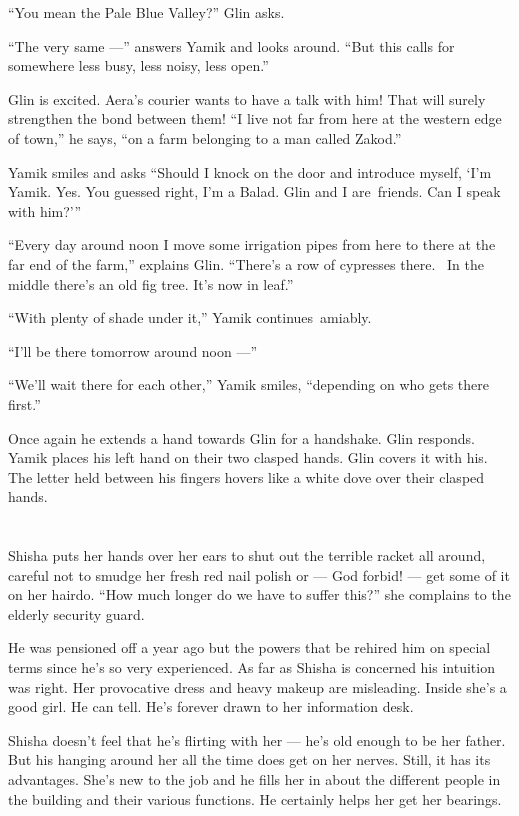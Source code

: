 \documentclass[twoside,11pt]{book}
\begin{document}
``You mean the Pale Blue Valley?'' Glin asks.

``The very same ---'' answers Yamik and looks around. ``But this calls for
somewhere less busy, less noisy, less open.''

Glin is excited.  Aera's courier wants to have a talk with him! That will surely strengthen the bond between them!
``I live not far from here at the western edge of town,'' he says, ``on a farm
belonging to a man called Zakod.''

Yamik smiles and asks ``Should I knock on the door and introduce myself, `I'm Yamik. Yes. You guessed
right, I'm a Balad. Glin and I are~friends. Can I speak with him?{}'\thinspace''

``Every day around noon I move some irrigation pipes from here to there at the far end of the farm,''
explains Glin. ``There's a row of cypresses there. ~In the middle there's an old fig tree. It's now in
leaf.''

``With plenty of shade under it,'' Yamik continues~amiably.

``I'll be there tomorrow around noon ---''

``We'll wait there for each other,'' Yamik smiles, ``depending on who gets there
first.''

Once again he extends a hand towards Glin for a handshake. Glin responds. Yamik places his left hand on their two
clasped hands. Glin covers it with his. The letter held between his fingers hovers like a white dove over their clasped
hands.


\bigskip

\chapter{}

Shisha puts her hands over her ears to shut out the terrible racket all around, careful not to smudge her fresh red nail
polish or --- God forbid! --- get some of it on her hairdo. ``How much longer do we have to suffer
this?'' she complains to the elderly security guard.

He was pensioned off a year ago but the powers that be rehired him on special terms since he's so very experienced. As
far as Shisha is concerned his intuition was right. Her provocative dress and heavy makeup are misleading. Inside she's
a good girl. He can tell. He's forever drawn to her information desk.

Shisha doesn't feel that he's flirting with her ---  he's old enough to be her father. But his hanging around her all
the time does get on her nerves. Still, it has its advantages. She's new to the job and he fills her in about the
different people in the building and their various functions. He certainly helps her get her bearings.
\end{document}

